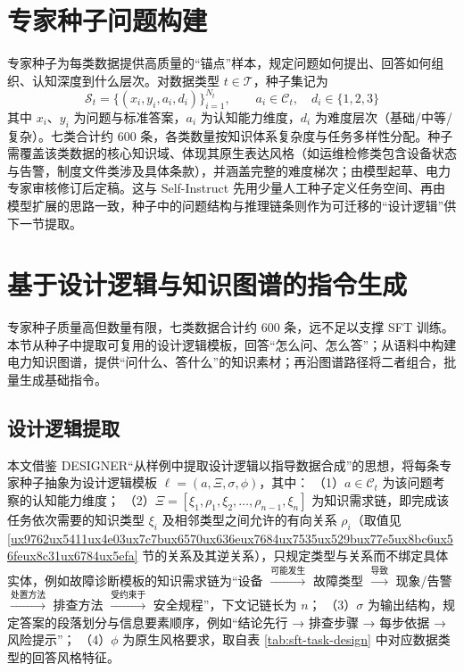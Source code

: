\documentclass[fontset=fandol,type=master,campus=shenzhen,etitleauto=true]{hithesisbook}
\begin{document}
\section{专家种子问题构建}\label{ux4e13ux5bb6ux79cdux5b50ux95eeux9898ux6784ux5efa}

专家种子为每类数据提供高质量的“锚点”样本，规定问题如何提出、回答如何组织、认知深度到什么层次。对数据类型 $t \in \mathcal{T}$，种子集记为
\begin{equation}
\mathcal{S}_t = \{(x_i, y_i, a_i, d_i)\}_{i=1}^{N_t}, \qquad a_i \in \mathcal{C}_t, \quad d_i \in \{1, 2, 3\}
\end{equation}
其中 $x_i$、$y_i$ 为问题与标准答案，$a_i$ 为认知能力维度，$d_i$ 为难度层次（基础/中等/复杂）。七类合计约 600 条，各类数量按知识体系复杂度与任务多样性分配。种子需覆盖该类数据的核心知识域、体现其原生表达风格（如运维检修类包含设备状态与告警，制度文件类涉及具体条款），并涵盖完整的难度梯次；由模型起草、电力专家审核修订后定稿。这与 Self-Instruct 先用少量人工种子定义任务空间、再由模型扩展的思路一致\cite{ref24}，种子中的问题结构与推理链条则作为可迁移的“设计逻辑”\cite{ref54}供下一节提取。

\section{基于设计逻辑与知识图谱的指令生成}\label{ux57faux4e8eux8bbeux8ba1ux903bux8f91ux63d0ux53d6ux4e0eux77e5ux8bc6ux56feux8c31ux7684ux4efbux52a1ux6570ux636eux751fux6210}

专家种子质量高但数量有限，七类数据合计约 600 条，远不足以支撑 SFT 训练。本节从种子中提取可复用的设计逻辑模板，回答“怎么问、怎么答”；从语料中构建电力知识图谱，提供“问什么、答什么”的知识素材；再沿图谱路径将二者组合，批量生成基础指令。

\subsection{设计逻辑提取}\label{ux4eceux4e13ux5bb6ux79cdux5b50ux4e2dux63d0ux53d6ux8bbeux8ba1ux903bux8f91}

本文借鉴 DESIGNER“从样例中提取设计逻辑以指导数据合成”的思想\cite{ref54}，将每条专家种子抽象为设计逻辑模板 $\ell = (a, \Xi, \sigma, \phi)$，其中：
（1）$a \in \mathcal{C}_t$ 为该问题考察的认知能力维度；
（2）$\Xi = [\xi_1, \rho_1, \xi_2, \ldots, \rho_{n-1}, \xi_n]$ 为知识需求链，即完成该任务依次需要的知识类型 $\xi_i$ 及相邻类型之间允许的有向关系 $\rho_i$（取值见 \ref{ux9762ux5411ux4e03ux7c7bux6570ux636eux7684ux7535ux529bux77e5ux8bc6ux56feux8c31ux6784ux5efa} 节的关系及其逆关系），只规定类型与关系而不绑定具体实体，例如故障诊断模板的知识需求链为“设备 $\xrightarrow{\text{可能发生}}$ 故障类型 $\xrightarrow{\text{导致}}$ 现象/告警 $\xrightarrow{\text{处置方法}}$ 排查方法 $\xrightarrow{\text{受约束于}}$ 安全规程”，下文记链长为 $n$；
（3）$\sigma$ 为输出结构，规定答案的段落划分与信息要素顺序，例如“结论先行 → 排查步骤 → 每步依据 → 风险提示”；
（4）$\phi$ 为原生风格要求，取自表 \ref{tab:sft-task-design} 中对应数据类型的回答风格特征。
\end{document}
